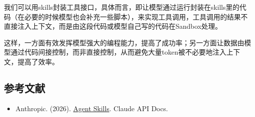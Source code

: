 我们可以用skills封装工具接口，具体而言，即让模型通过运行封装在skills里的代码（在必要的时候模型也会补充一些脚本），来实现工具调用，工具调用的结果不直接注入上下文，而是由这段代码或模型自己写的代码在Sandbox处理。

这样，一方面有效发挥模型强大的编程能力，提高了成功率；另一方面让数据由模型通过代码间接控制，而非直接控制，从而避免大量token被不必要地注入上下文，提高了效率。

\hypertarget{ux53c2ux8003ux6587ux732e-122}{%
\subsection{参考文献}\label{ux53c2ux8003ux6587ux732e-122}}

\begin{itemize}
\tightlist
\item
  Anthropic. (2026). \href{https://platform.claude.com/docs/en/agents-and-tools/agent-skills/overview}{Agent Skills}. Claude API Docs.
\end{itemize}

\clearpage
